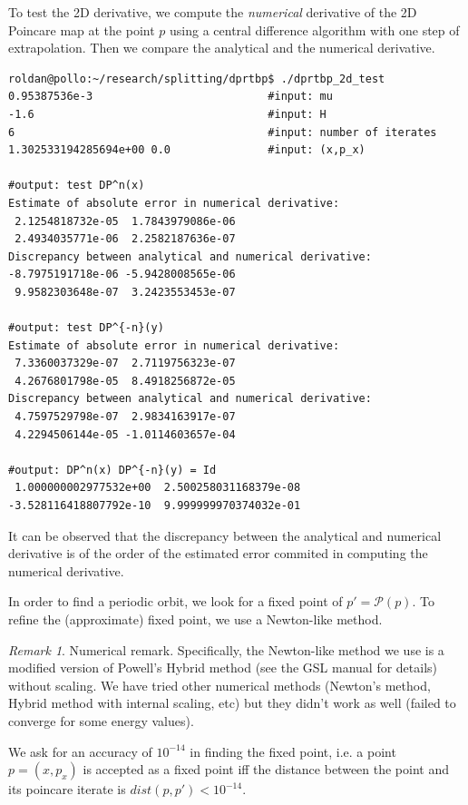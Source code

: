 \documentclass[a4paper]{amsart}
\theoremstyle{remark}
\newtheorem{rem}[thm]{Remark}
\newcommand{\sixmap}{\mathcal{P}}
\begin{document}
To test the 2D derivative, we compute the \emph{numerical} derivative of the
2D Poincare map at the point $p$ using a central difference algorithm with
one step of extrapolation. Then we compare the analytical and the numerical
derivative.

\begin{verbatim}
roldan@pollo:~/research/splitting/dprtbp$ ./dprtbp_2d_test 
0.95387536e-3                           #input: mu
-1.6                                    #input: H
6                                       #input: number of iterates
1.302533194285694e+00 0.0               #input: (x,p_x)

#output: test DP^n(x)
Estimate of absolute error in numerical derivative:
 2.1254818732e-05  1.7843979086e-06
 2.4934035771e-06  2.2582187636e-07
Discrepancy between analytical and numerical derivative:
-8.7975191718e-06 -5.9428008565e-06
 9.9582303648e-07  3.2423553453e-07

#output: test DP^{-n}(y)
Estimate of absolute error in numerical derivative:
 7.3360037329e-07  2.7119756323e-07
 4.2676801798e-05  8.4918256872e-05
Discrepancy between analytical and numerical derivative:
 4.7597529798e-07  2.9834163917e-07
 4.2294506144e-05 -1.0114603657e-04

#output: DP^n(x) DP^{-n}(y) = Id
 1.000000002977532e+00  2.500258031168379e-08
-3.528116418807792e-10  9.999999970374032e-01
\end{verbatim}
It can be observed that the discrepancy between the analytical and numerical
derivative is of the order of the estimated error commited in computing the
numerical derivative.

In order to find a periodic orbit, we look for a fixed point of
$p'=\sixmap(p)$. 
To refine the (approximate) fixed point, we use a Newton-like method. 

\begin{rem}
Numerical remark. Specifically, the Newton-like method we use is a modified
version of Powell's Hybrid method (see the GSL manual for details) without
scaling.
We have tried other numerical methods (Newton's method, Hybrid method with
internal scaling, etc) but they didn't work as well (failed to converge for
some energy values).
\end{rem}

We ask for an accuracy of $10^{-14}$ in finding the fixed
point, i.e. a point $p=(x,p_x)$ is accepted as a fixed point iff the distance
between the point and its poincare iterate is
$dist(p,p')<10^{-14}$.
\end{document}
